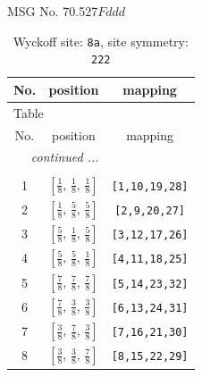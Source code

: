 \documentclass[fleqn,8pt]{jsarticle}
\begin{document}
\setcounter{MaxMatrixCols}{32}

\renewcommand{\tablename}{Table~}
\renewcommand{\figurename}{Figure~}
\begin{center}
\LARGE
MSG No. 70.527\quad$Fddd$
\end{center}
\renewcommand{\arraystretch}{1.2}
\begin{longtable}{ccc}
\caption{Wyckoff site: {\tt 8a}, site symmetry: {\tt 222}}
 \\
 \hline \hline
No. & position & mapping \\ \hline \endfirsthead

\multicolumn{2}{l}{\tablename\ \thetable{}} \\
 \hline \hline
No. & position & mapping \\ \hline \endhead

 \hline \hline
\multicolumn{2}{r}{\footnotesize\it continued ...} \\ \endfoot

 \hline \hline
\multicolumn{2}{r}{} \\ \endlastfoot

1 & $\left[ \frac{1}{8},\, \frac{1}{8},\, \frac{1}{8} \right]$ & {\tt [1,10,19,28]} \\ \hline
2 & $\left[ \frac{1}{8},\, \frac{5}{8},\, \frac{5}{8} \right]$ & {\tt [2,9,20,27]} \\ \hline
3 & $\left[ \frac{5}{8},\, \frac{1}{8},\, \frac{5}{8} \right]$ & {\tt [3,12,17,26]} \\ \hline
4 & $\left[ \frac{5}{8},\, \frac{5}{8},\, \frac{1}{8} \right]$ & {\tt [4,11,18,25]} \\ \hline
5 & $\left[ \frac{7}{8},\, \frac{7}{8},\, \frac{7}{8} \right]$ & {\tt [5,14,23,32]} \\ \hline
6 & $\left[ \frac{7}{8},\, \frac{3}{8},\, \frac{3}{8} \right]$ & {\tt [6,13,24,31]} \\ \hline
7 & $\left[ \frac{3}{8},\, \frac{7}{8},\, \frac{3}{8} \right]$ & {\tt [7,16,21,30]} \\ \hline
8 & $\left[ \frac{3}{8},\, \frac{3}{8},\, \frac{7}{8} \right]$ & {\tt [8,15,22,29]} \\
\end{longtable}
\renewcommand{\arraystretch}{1.2}
\end{document}
